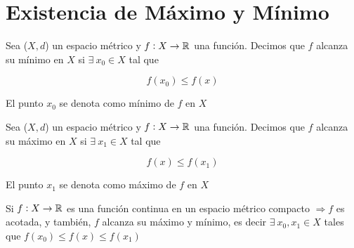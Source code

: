 \section{Existencia de Máximo y Mínimo}

\begin{definition}[Mínimo]
    Sea ($X,d$) un espacio métrico y $f : X \to \mathbb{R}$ una función. Decimos que $f$ alcanza su mínimo en $X$ si  $\exists \: x_0 \in X$ tal que

    $$f(x_0) \leqslant f(x)$$

    
    El punto $x_0$ se denota como mínimo de $f$ en $X$
\end{definition}

\begin{definition}[Máximo]
    Sea ($X,d$) un espacio métrico y $f : X \to \mathbb{R}$ una función. Decimos que $f$ alcanza su máximo en $X$ si  $\exists \: x_1 \in X$ tal que

    $$f(x) \leqslant f(x_1)$$

    
    El punto $x_1$ se denota como máximo de $f$ en $X$
\end{definition}

\begin{theorem}
    Si $f : X \to \mathbb{R}$ es una función continua en un espacio métrico compacto $\Rightarrow f$ es acotada, y también, $f$ alcanza su máximo y mínimo, es decir $\exists \: x_0, x_1 \in  X$ tales que $f(x_0) \leqslant f(x) \leqslant f(x_1)$
\end{theorem}

